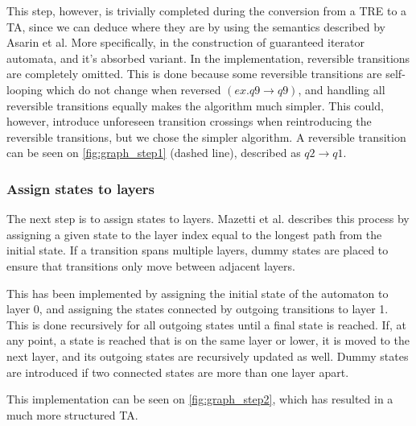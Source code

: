 This step, however, is trivially completed during the conversion from a TRE to a TA, since we can deduce where they are by using the semantics described by Asarin et al.
More specifically, in the construction of guaranteed iterator automata, and it's absorbed variant\cite{Eugene2001}.
In the implementation, reversible transitions are completely omitted. This is done because some reversible transitions are self-looping which do not change when reversed $(ex. q9\rightarrow q9)$, and handling all reversible transitions equally makes the algorithm much simpler. This could, however, introduce unforeseen transition crossings when reintroducing the reversible transitions, but we chose the simpler algorithm. A reversible transition can be seen on \cref{fig:graph_step1} (dashed line), described as $q2\rightarrow q1$.

\begin{center}
    
\end{center}

\subsubsection{Assign states to layers}
The next step is to assign states to layers. Mazetti et al. describes this process by assigning a given state to the layer index equal to the longest path from the initial state. If a transition spans multiple layers, dummy states are placed to ensure that transitions only move between adjacent layers. \cite{Mazetti2012}

This has been implemented by assigning the initial state of the automaton to layer 0, and assigning the states connected by outgoing transitions to layer 1.
This is done recursively for all outgoing states until a final state is reached.
If, at any point, a state is reached that is on the same layer or lower, it is moved to the next layer, and its outgoing states are recursively updated as well.
Dummy states are introduced if two connected states are more than one layer apart.

This implementation can be seen on \cref{fig:graph_step2}, which has resulted in a much more structured TA.

\begin{center}
    
\end{center}

